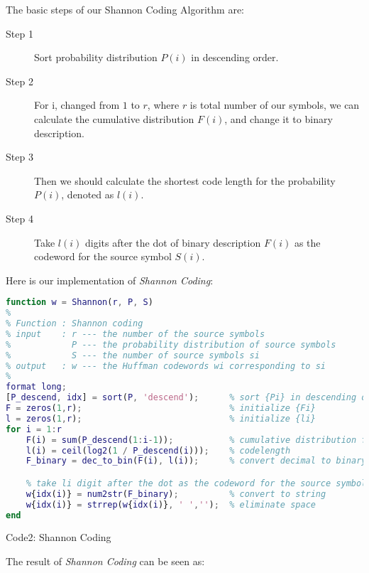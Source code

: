 \documentclass[12pt]{article} %
\numberwithin{equation}{section}
\begin{document}
The basic steps of our Shannon Coding Algorithm are:

\begin{mdframed}[leftmargin=-10pt,rightmargin=-10pt]
\begin{description} %

\item[Step 1] Sort probability distribution ${P(i)}$ in descending order.

\item[Step 2] For i, changed from $1$ to $r$, where $r$ is total number of our symbols, we can calculate the cumulative distribution $F(i)$, and change it to binary description.

\item[Step 3] Then we should calculate the shortest code length for the probability $P(i)$, denoted as ${l(i)}$.

\item[Step 4] Take $l(i)$ digits after the dot of binary description $F(i)$ as the codeword for the source symbol $S(i)$.
\end{description}
\end{mdframed}

Here is our implementation of \emph{Shannon Coding}:
\begin{lstlisting}[language=matlab]
function w = Shannon(r, P, S)
%
% Function : Shannon coding
% input    : r --- the number of the source symbols
%            P --- the probability distribution of source symbols
%            S --- the number of source symbols si
% output   : w --- the Huffman codewords wi corresponding to si
%
format long;
[P_descend, idx] = sort(P, 'descend');      % sort {Pi} in descending order
F = zeros(1,r);                             % initialize {Fi}
l = zeros(1,r);                             % initialize {li}
for i = 1:r
    F(i) = sum(P_descend(1:i-1));           % cumulative distribution function
    l(i) = ceil(log2(1 / P_descend(i)));    % codelength
    F_binary = dec_to_bin(F(i), l(i));      % convert decimal to binary

    % take li digit after the dot as the codeword for the source symbol idx(i)
    w{idx(i)} = num2str(F_binary);          % convert to string
    w{idx(i)} = strrep(w{idx(i)}, ' ','');  % eliminate space
end
\end{lstlisting}
\begin{center}
  Code2: Shannon Coding
\end{center}

The result of \emph{Shannon Coding} can be seen as:
\end{document}
